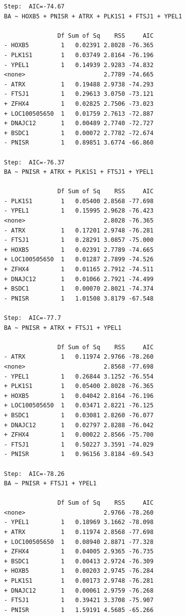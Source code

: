 \documentclass[
  dutch,
  letterpaper,
  12pt]{book}
\newcounter{none} %
\theoremstyle{definition}
\theoremstyle{definition}
\theoremstyle{definition}
\theoremstyle{remark}
\begin{document}
\begin{verbatim}
Step:  AIC=-74.67
BA ~ HOXB5 + PNISR + ATRX + PLK1S1 + FTSJ1 + YPEL1

               Df Sum of Sq    RSS     AIC
- HOXB5         1   0.02391 2.8028 -76.365
- PLK1S1        1   0.03749 2.8164 -76.196
- YPEL1         1   0.14939 2.9283 -74.832
<none>                      2.7789 -74.665
- ATRX          1   0.19488 2.9738 -74.293
- FTSJ1         1   0.29613 3.0750 -73.121
+ ZFHX4         1   0.02825 2.7506 -73.023
+ LOC100505650  1   0.01759 2.7613 -72.887
+ DNAJC12       1   0.00489 2.7740 -72.727
+ BSDC1         1   0.00072 2.7782 -72.674
- PNISR         1   0.89851 3.6774 -66.860

Step:  AIC=-76.37
BA ~ PNISR + ATRX + PLK1S1 + FTSJ1 + YPEL1

               Df Sum of Sq    RSS     AIC
- PLK1S1        1   0.05400 2.8568 -77.698
- YPEL1         1   0.15995 2.9628 -76.423
<none>                      2.8028 -76.365
- ATRX          1   0.17201 2.9748 -76.281
- FTSJ1         1   0.28291 3.0857 -75.000
+ HOXB5         1   0.02391 2.7789 -74.665
+ LOC100505650  1   0.01287 2.7899 -74.526
+ ZFHX4         1   0.01165 2.7912 -74.511
+ DNAJC12       1   0.01066 2.7921 -74.499
+ BSDC1         1   0.00070 2.8021 -74.374
- PNISR         1   1.01508 3.8179 -67.548

Step:  AIC=-77.7
BA ~ PNISR + ATRX + FTSJ1 + YPEL1

               Df Sum of Sq    RSS     AIC
- ATRX          1   0.11974 2.9766 -78.260
<none>                      2.8568 -77.698
- YPEL1         1   0.26844 3.1252 -76.554
+ PLK1S1        1   0.05400 2.8028 -76.365
+ HOXB5         1   0.04042 2.8164 -76.196
+ LOC100505650  1   0.03471 2.8221 -76.125
+ BSDC1         1   0.03081 2.8260 -76.077
+ DNAJC12       1   0.02797 2.8288 -76.042
+ ZFHX4         1   0.00022 2.8566 -75.700
- FTSJ1         1   0.50227 3.3591 -74.029
- PNISR         1   0.96156 3.8184 -69.543

Step:  AIC=-78.26
BA ~ PNISR + FTSJ1 + YPEL1

               Df Sum of Sq    RSS     AIC
<none>                      2.9766 -78.260
- YPEL1         1   0.18969 3.1662 -78.098
+ ATRX          1   0.11974 2.8568 -77.698
+ LOC100505650  1   0.08940 2.8871 -77.328
+ ZFHX4         1   0.04005 2.9365 -76.735
+ BSDC1         1   0.00413 2.9724 -76.309
+ HOXB5         1   0.00203 2.9745 -76.284
+ PLK1S1        1   0.00173 2.9748 -76.281
+ DNAJC12       1   0.00061 2.9759 -76.268
- FTSJ1         1   0.39421 3.3708 -75.907
- PNISR         1   1.59191 4.5685 -65.266
\end{verbatim}
\end{document}
